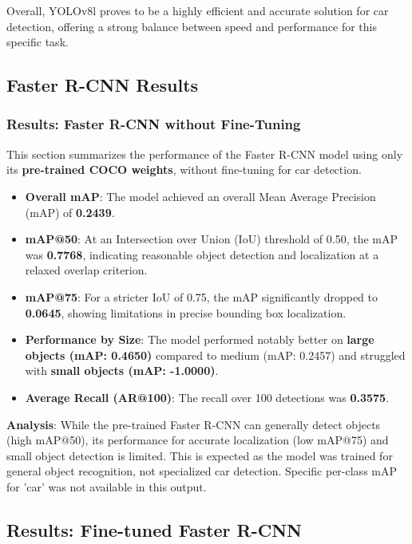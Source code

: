 \documentclass[12pt,a4paper]{article}
\begin{document}
Overall, YOLOv8l proves to be a highly efficient and accurate solution for car detection, offering a strong balance between speed and performance for this specific task.

\subsection{Faster R-CNN Results}
\subsubsection{Results: Faster R-CNN without Fine-Tuning}
\label{ssec:results_fasterrcnn_pretrained}

This section summarizes the performance of the Faster R-CNN model using only its \textbf{pre-trained COCO weights}, without fine-tuning for car detection.

\begin{itemize}
    \item \textbf{Overall mAP}: The model achieved an overall Mean Average Precision (mAP) of \textbf{0.2439}.
    \item \textbf{mAP@50}: At an Intersection over Union (IoU) threshold of 0.50, the mAP was \textbf{0.7768}, indicating reasonable object detection and localization at a relaxed overlap criterion.
    \item \textbf{mAP@75}: For a stricter IoU of 0.75, the mAP significantly dropped to \textbf{0.0645}, showing limitations in precise bounding box localization.
    \item \textbf{Performance by Size}: The model performed notably better on \textbf{large objects (mAP: 0.4650)} compared to medium (mAP: 0.2457) and struggled with \textbf{small objects (mAP: -1.0000)}.
    \item \textbf{Average Recall (AR@100)}: The recall over 100 detections was \textbf{0.3575}.
\end{itemize}

\textbf{Analysis}: While the pre-trained Faster R-CNN can generally detect objects (high mAP@50), its performance for accurate localization (low mAP@75) and small object detection is limited. This is expected as the model was trained for general object recognition, not specialized car detection. Specific per-class mAP for 'car' was not available in this output.

\subsection{Results: Fine-tuned Faster R-CNN}
\label{ssec:results_fasterrcnn_finetuned}
\end{document}
